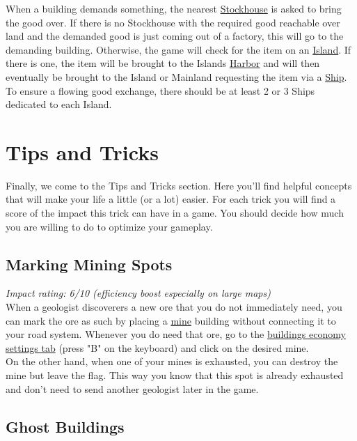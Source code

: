 \documentclass[12pt]{article}
\begin{document}
When a building demands something, the nearest \hyperref[sec:stockhouse]{Stockhouse} is asked to bring the good over. If there is no Stockhouse with the required good reachable over land and the demanded good is just coming out of a factory, this will go to the demanding building. Otherwise, the game will check for the item on an \hyperref[sec:islands]{Island}. If there is one, the item will be brought to the Islands \hyperref[sec:harbor]{Harbor} and will then eventually be brought to the Island or Mainland requesting the item via a \hyperref[sec:ships]{Ship}. To ensure a flowing good exchange, there should be at least 2 or 3 Ships dedicated to each Island.

\section{Tips and Tricks}
\label{sec:tipsandtricks}

Finally, we come to the Tips and Tricks section. Here you'll find helpful concepts that will make your life a little (or a lot) easier. For each trick you will find a score of the impact this trick can have in a game. You should decide how much you are willing to do to optimize your gameplay.

\subsection{Marking Mining Spots}

\textit{Impact rating: 6/10 (efficiency boost especially on large maps)}\\

When a geologist discoverers a new ore that you do not immediately need, you can mark the ore as such by placing a \hyperref[sec:mines]{mine} building without connecting it to your road system. Whenever you do need that ore, go to the \hyperref[sec:economybuildings]{buildings economy settings tab} (press "B" on the keyboard) and click on the desired mine.\\

On the other hand, when one of your mines is exhausted, you can destroy the mine but leave the flag. This way you know that this spot is already exhausted and don't need to send another geologist later in the game.

\subsection{Ghost Buildings}
\label{sec:ghostbuildings}
\end{document}
